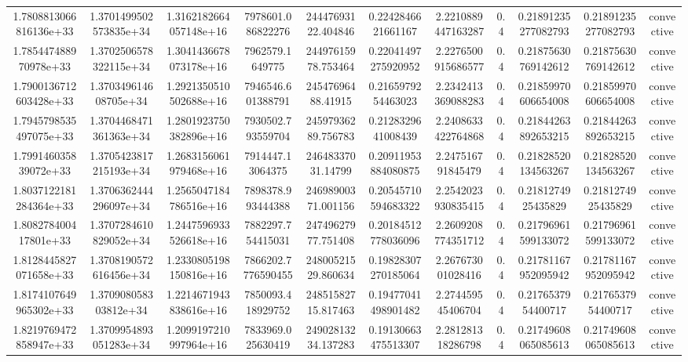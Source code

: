\begin{table}
\begin{tabular}{ccccccccccc}
1.7808813066816136e+33 & 1.3701499502573835e+34 & 1.3162182664057148e+16 & 7978601.086822276 & 24447693122.404846 & 0.2242846621661167 & 2.2210889447163287 & 0.4 & 0.21891235277082793 & 0.21891235277082793 & convective \\
1.785447488970978e+33 & 1.3702506578322115e+34 & 1.3041436678073178e+16 & 7962579.1649775 & 24497615978.753464 & 0.22041497275920952 & 2.2276500915686577 & 0.4 & 0.21875630769142612 & 0.21875630769142612 & convective \\
1.7900136712603428e+33 & 1.370349614608705e+34 & 1.2921350510502688e+16 & 7946546.601388791 & 24547696488.41915 & 0.2165979254463023 & 2.2342413369088283 & 0.4 & 0.21859970606654008 & 0.21859970606654008 & convective \\
1.7945798535497075e+33 & 1.3704468471361363e+34 & 1.2801923750382896e+16 & 7930502.793559704 & 24597936289.756783 & 0.2128329641008439 & 2.2408633422764868 & 0.4 & 0.21844263892653215 & 0.21844263892653215 & convective \\
1.799146035839072e+33 & 1.3705423817215193e+34 & 1.2683156061979468e+16 & 7914447.13064375 & 24648337031.14799 & 0.20911953884080875 & 2.247516791845479 & 0.4 & 0.21828520134563267 & 0.21828520134563267 & convective \\
1.8037122181284364e+33 & 1.3706362444296097e+34 & 1.2565047184786516e+16 & 7898378.993444388 & 24698900371.001156 & 0.20545710594683322 & 2.2542023930835415 & 0.4 & 0.2181274925435829 & 0.2181274925435829 & convective \\
1.808278400417801e+33 & 1.3707284610829052e+34 & 1.2447596933526618e+16 & 7882297.754415031 & 24749627977.751408 & 0.20184512778036096 & 2.2609208774351712 & 0.4 & 0.21796961599133072 & 0.21796961599133072 & convective \\
1.8128445827071658e+33 & 1.3708190572616456e+34 & 1.2330805198150816e+16 & 7866202.7776590455 & 24800521529.860634 & 0.19828307270185064 & 2.267673001028416 & 0.4 & 0.21781167952095942 & 0.21781167952095942 & convective \\
1.8174107649965302e+33 & 1.370908058303812e+34 & 1.2214671943838616e+16 & 7850093.418929752 & 24851582715.817463 & 0.19477041498901482 & 2.274459545406704 & 0.4 & 0.2176537954400717 & 0.2176537954400717 & convective \\
1.8219769472858947e+33 & 1.3709954893051283e+34 & 1.2099197210997964e+16 & 7833969.025630419 & 24902813234.137283 & 0.19130663475513307 & 2.281281318286798 & 0.4 & 0.21749608065085613 & 0.21749608065085613 & convective \\

\end{tabular}
\end{table}
